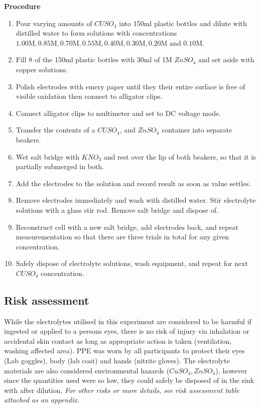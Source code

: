 \documentclass[11pt,a4paper]{article}
\begin{document}
\textbf{Procedure}
\small
\begin{enumerate}
	\item Pour varying amounts of $CUSO_4$ into 150ml plastic bottles and dilute with distilled water to form solutions with concentrations $1.00\textrm{M}, 0.85\textrm{M}, 0.70\textrm{M}, 0.55\textrm{M}, 0.40\textrm{M}, 0.30\textrm{M}, 0.20\textrm{M and } 0.10\textrm{M}$.
	
	\item Fill 8 of the 150ml plastic bottles with 30ml of 1M $ZnSO_4$ and set aside with copper solutions. 
	
	\item Polish electrodes with emery paper until they their entire surface is free of visible oxidation then connect to alligator clips.
	
	\item Connect alligator clips to multimeter and set to DC voltage mode.
	
	\item Transfer the contents of a $CUSO_4$, and $ZnSO_4$ container into separate beakers.
	
	\item Wet salt bridge with $KNO_3$ and rest over the lip of both beakers, so that it is partially submerged in both. 
	
	\item Add the electrodes to the solution and record result as soon as value settles.
	
	\item Remove electrodes immediately and wash with distilled water. Stir electrolyte solutions with a glass stir rod. Remove salt bridge and dispose of.
	
	\item Reconstruct cell with a new salt bridge, add electrodes back, and repeat measurementation so that there are three trials in total for any given concentration.
	
	\item Safely dispose of electrolyte solutions, wash equipment, and repeat for next $CUSO_4$ concentration.
\end{enumerate}

\subsection{Risk assessment}
While the electrolytes utilised in this experiment are considered to be harmful if ingested or applied to a persons eyes, there is no risk of injury via inhalation or accidental skin contact as long as appropriate action is taken (ventilation, washing affected area). PPE was worn by all participants to protect their eyes (Lab goggles), body (lab coat) and hands (nitrite gloves). The electrolyte materials are also considered environmental hazards ($CuSO_4, ZnSO_4$), however since the quantities used were so low, they could safely be disposed of in the sink with after dilution.
\textit{For other risks or more details, see risk assessment table attached as an appendix.}
\end{document}
